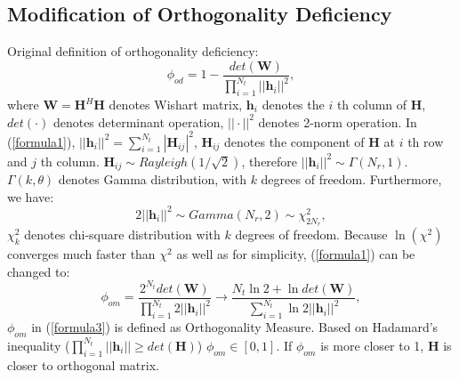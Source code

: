 \documentclass[12pt,letter,final]{article}
\begin{document}
\begin{spacing}{2.5}
%
\section{Modification of Orthogonality Deficiency}
Original definition of orthogonality deficiency:
\begin{equation}
\phi_{od}=1-\frac{det(\mathbf{W})}{\prod_{i=1}^{N_{t}}||\mathbf{h}_{i}||^{2}},
\label{formula1}
\end{equation}
where $\mathbf{W}=\mathbf{H}^{H}\mathbf{H}$ denotes Wishart matrix, $\mathbf{h}_{i}$ denotes the $i$ th column of $\mathbf{H}$, $det(\cdot)$ denotes determinant operation, $||\cdot||^{2}$ denotes 2-norm operation.
In (\ref{formula1}), $||\mathbf{h}_{i}||^{2}=\sum_{i=1}^{N_{t}}|\mathbf{H}_{ij}|^{2}$, $\mathbf{H}_{ij}$ denotes the component of $\mathbf{H}$ at $i$ th row and $j$ th column. $\mathbf{H}_{ij}\sim Rayleigh(1/\sqrt{2})$, therefore $||\mathbf{h}_{i}||^{2}\sim\Gamma(N_{r},1)$\cite{papoulis1996stochastic}. $\Gamma(k,\theta)$ denotes Gamma distribution, with $k$ degrees of freedom. Furthermore, we have:
\begin{equation}
2||\mathbf{h}_{i}||^{2}\sim Gamma(N_{r},2)\sim\chi^{2}_{2N_{r}},
\label{formula2}
\end{equation} 
$\chi^{2}_{k}$ denotes chi-square distribution with $k$ degrees of freedom. Because $\ln(\chi^{2})$ converges much faster than $\chi^{2}$\cite{shoemaker2003fixing}\cite{bartlett1946statistical} as well as for simplicity, (\ref{formula1}) can be changed to:
\begin{equation}
\phi_{om}=\frac{2^{N_{t}}det(\mathbf{W})}{\prod_{i=1}^{N_{t}}2||\mathbf{h}_{i}||^{2}}
\longrightarrow \frac{N_{t}\ln{2}+\ln{det(\mathbf{W})}}{\sum_{i=1}^{N_{t}}\ln{2}||\mathbf{h}_{i}||^{2}},
\label{formula3}
\end{equation}
$\phi_{om}$ in (\ref{formula3}) is defined as Orthogonality Measure. Based on Hadamard's inequality ($\prod_{i=1}^{N_{t}}||\mathbf{h}_{i}||\geq det(\mathbf{H})$) $\phi_{om}\in [0,1]$. If $\phi_{om}$ is more closer to 1, $\mathbf{H}$ is closer to orthogonal matrix. 

\end{spacing}
\end{document}
